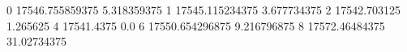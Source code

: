 0 17546.755859375 5.318359375
1 17545.115234375 3.677734375
2 17542.703125 1.265625
4 17541.4375 0.0
6 17550.654296875 9.216796875
8 17572.46484375 31.02734375
